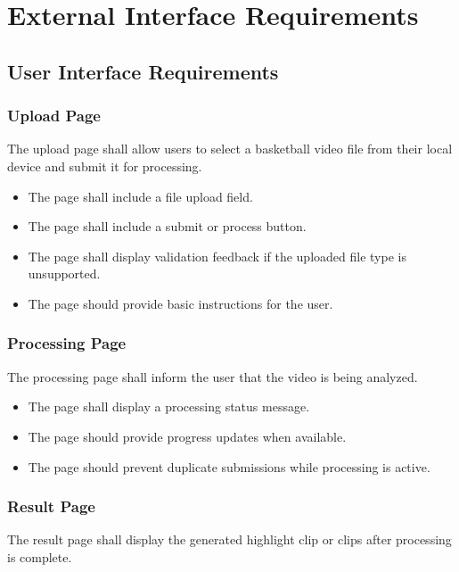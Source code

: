 \documentclass[12pt]{article}
\begin{document}
\newpage

\section{External Interface Requirements}

\subsection{User Interface Requirements}

\subsubsection{Upload Page}
The upload page shall allow users to select a basketball video file from their local device and submit it for processing.

\begin{itemize}[noitemsep]
    \item The page shall include a file upload field.
    \item The page shall include a submit or process button.
    \item The page shall display validation feedback if the uploaded file type is unsupported.
    \item The page should provide basic instructions for the user.
\end{itemize}

\subsubsection{Processing Page}
The processing page shall inform the user that the video is being analyzed.

\begin{itemize}[noitemsep]
    \item The page shall display a processing status message.
    \item The page should provide progress updates when available.
    \item The page should prevent duplicate submissions while processing is active.
\end{itemize}

\subsubsection{Result Page}
The result page shall display the generated highlight clip or clips after processing is complete.
\end{document}

